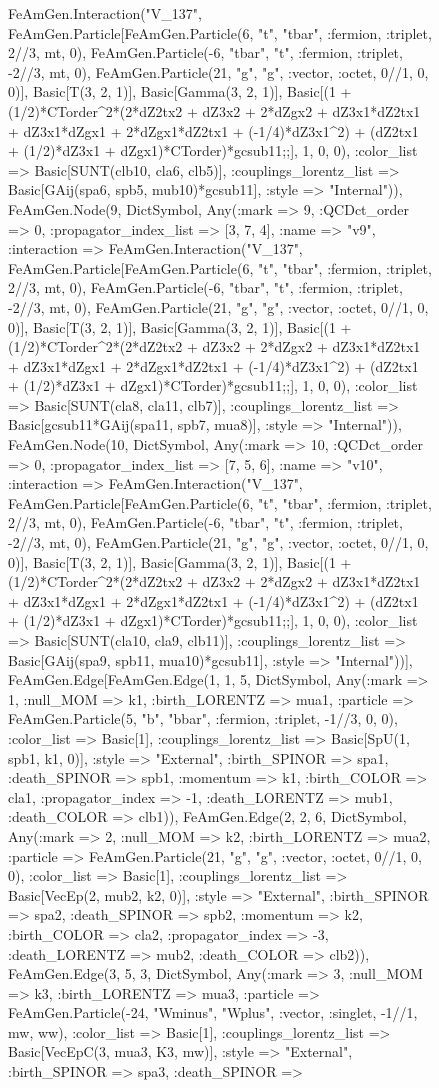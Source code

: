 \documentclass{revtex4}
\begin{document}
\begin{figure}[!htb]
\begin{center}
{FeAmGen.Interaction("V_137", FeAmGen.Particle[FeAmGen.Particle(6, "t", "tbar", :fermion, :triplet, 2//3, mt, 0), FeAmGen.Particle(-6, "tbar", "t", :fermion, :triplet, -2//3, mt, 0), FeAmGen.Particle(21, "g", "g", :vector, :octet, 0//1, 0, 0)], Basic[T(3, 2, 1)], Basic[Gamma(3, 2, 1)], Basic[(1 + (1/2)*CTorder^2*(2*dZ2tx2 + dZ3x2 + 2*dZgx2 + dZ3x1*dZ2tx1 + dZ3x1*dZgx1 + 2*dZgx1*dZ2tx1 + (-1/4)*dZ3x1^2) + (dZ2tx1 + (1/2)*dZ3x1 + dZgx1)*CTorder)*gcsub11;;], 1, 0, 0), :color_list => Basic[SUNT(clb10, cla6, clb5)], :couplings_lorentz_list => Basic[GAij(spa6, spb5, mub10)*gcsub11], :style => "Internal")), FeAmGen.Node(9, Dict{Symbol, Any}(:mark => 9, :QCDct_order => 0, :propagator_index_list => [3, 7, 4], :name => "v9", :interaction => FeAmGen.Interaction("V_137", FeAmGen.Particle[FeAmGen.Particle(6, "t", "tbar", :fermion, :triplet, 2//3, mt, 0), FeAmGen.Particle(-6, "tbar", "t", :fermion, :triplet, -2//3, mt, 0), FeAmGen.Particle(21, "g", "g", :vector, :octet, 0//1, 0, 0)], Basic[T(3, 2, 1)], Basic[Gamma(3, 2, 1)], Basic[(1 + (1/2)*CTorder^2*(2*dZ2tx2 + dZ3x2 + 2*dZgx2 + dZ3x1*dZ2tx1 + dZ3x1*dZgx1 + 2*dZgx1*dZ2tx1 + (-1/4)*dZ3x1^2) + (dZ2tx1 + (1/2)*dZ3x1 + dZgx1)*CTorder)*gcsub11;;], 1, 0, 0), :color_list => Basic[SUNT(cla8, cla11, clb7)], :couplings_lorentz_list => Basic[gcsub11*GAij(spa11, spb7, mua8)], :style => "Internal")), FeAmGen.Node(10, Dict{Symbol, Any}(:mark => 10, :QCDct_order => 0, :propagator_index_list => [7, 5, 6], :name => "v10", :interaction => FeAmGen.Interaction("V_137", FeAmGen.Particle[FeAmGen.Particle(6, "t", "tbar", :fermion, :triplet, 2//3, mt, 0), FeAmGen.Particle(-6, "tbar", "t", :fermion, :triplet, -2//3, mt, 0), FeAmGen.Particle(21, "g", "g", :vector, :octet, 0//1, 0, 0)], Basic[T(3, 2, 1)], Basic[Gamma(3, 2, 1)], Basic[(1 + (1/2)*CTorder^2*(2*dZ2tx2 + dZ3x2 + 2*dZgx2 + dZ3x1*dZ2tx1 + dZ3x1*dZgx1 + 2*dZgx1*dZ2tx1 + (-1/4)*dZ3x1^2) + (dZ2tx1 + (1/2)*dZ3x1 + dZgx1)*CTorder)*gcsub11;;], 1, 0, 0), :color_list => Basic[SUNT(cla10, cla9, clb11)], :couplings_lorentz_list => Basic[GAij(spa9, spb11, mua10)*gcsub11], :style => "Internal"))], FeAmGen.Edge[FeAmGen.Edge(1, 1, 5, Dict{Symbol, Any}(:mark => 1, :null_MOM => k1, :birth_LORENTZ => mua1, :particle => FeAmGen.Particle(5, "b", "bbar", :fermion, :triplet, -1//3, 0, 0), :color_list => Basic[1], :couplings_lorentz_list => Basic[SpU(1, spb1, k1, 0)], :style => "External", :birth_SPINOR => spa1, :death_SPINOR => spb1, :momentum => k1, :birth_COLOR => cla1, :propagator_index => -1, :death_LORENTZ => mub1, :death_COLOR => clb1)), FeAmGen.Edge(2, 2, 6, Dict{Symbol, Any}(:mark => 2, :null_MOM => k2, :birth_LORENTZ => mua2, :particle => FeAmGen.Particle(21, "g", "g", :vector, :octet, 0//1, 0, 0), :color_list => Basic[1], :couplings_lorentz_list => Basic[VecEp(2, mub2, k2, 0)], :style => "External", :birth_SPINOR => spa2, :death_SPINOR => spb2, :momentum => k2, :birth_COLOR => cla2, :propagator_index => -3, :death_LORENTZ => mub2, :death_COLOR => clb2)), FeAmGen.Edge(3, 5, 3, Dict{Symbol, Any}(:mark => 3, :null_MOM => k3, :birth_LORENTZ => mua3, :particle => FeAmGen.Particle(-24, "Wminus", "Wplus", :vector, :singlet, -1//1, mw, ww), :color_list => Basic[1], :couplings_lorentz_list => Basic[VecEpC(3, mua3, K3, mw)], :style => "External", :birth_SPINOR => spa3, :death_SPINOR => }
\end{center}
\end{figure}
\end{document}
